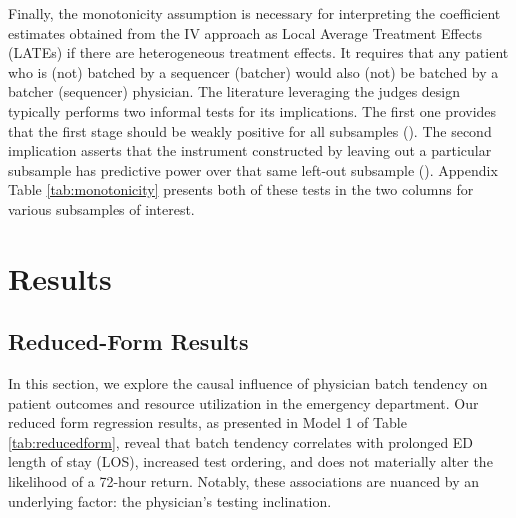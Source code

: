 \documentclass[,,nonblindrev]{informs}
\begin{document}
Finally, the monotonicity assumption is necessary for interpreting the
coefficient estimates obtained from the IV approach as Local Average
Treatment Effects (LATEs) if there are heterogeneous treatment effects.
It requires that any patient who is (not) batched by a sequencer
(batcher) would also (not) be batched by a batcher (sequencer)
physician. The literature leveraging the judges design typically
performs two informal tests for its implications. The first one provides
that the first stage should be weakly positive for all subsamples
(\citet{dobbie2018effects}). The second implication asserts that the
instrument constructed by leaving out a particular subsample has
predictive power over that same left-out subsample
(\citet{bhuller2020incarceration}). Appendix Table
\ref{tab:monotonicity} presents both of these tests in the two columns
for various subsamples of interest.

\hypertarget{sec:4}{%
\section{Results}\label{sec:4}}

\hypertarget{reduced-form-results}{%
\subsection{Reduced-Form Results}\label{reduced-form-results}}

In this section, we explore the causal influence of physician batch
tendency on patient outcomes and resource utilization in the emergency
department. Our reduced form regression results, as presented in Model 1
of Table \ref{tab:reducedform}, reveal that batch tendency correlates
with prolonged ED length of stay (LOS), increased test ordering, and
does not materially alter the likelihood of a 72-hour return. Notably,
these associations are nuanced by an underlying factor: the physician's
testing inclination.
\end{document}
